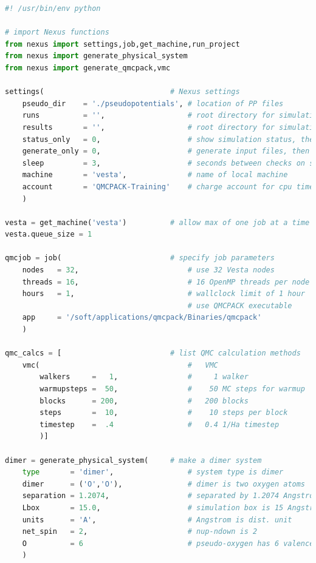 \begin{lstlisting}[language=Python]
#! /usr/bin/env python

# import Nexus functions
from nexus import settings,job,get_machine,run_project 
from nexus import generate_physical_system
from nexus import generate_qmcpack,vmc

settings(                             # Nexus settings
    pseudo_dir    = './pseudopotentials', # location of PP files
    runs          = '',                   # root directory for simulations
    results       = '',                   # root directory for simulation results
    status_only   = 0,                    # show simulation status, then exit
    generate_only = 0,                    # generate input files, then exit
    sleep         = 3,                    # seconds between checks on sim. progress
    machine       = 'vesta',              # name of local machine
    account       = 'QMCPACK-Training'    # charge account for cpu time
    ) 

vesta = get_machine('vesta')          # allow max of one job at a time (lab only)
vesta.queue_size = 1

qmcjob = job(                         # specify job parameters
    nodes   = 32,                         # use 32 Vesta nodes
    threads = 16,                         # 16 OpenMP threads per node (32 MPI tasks)
    hours   = 1,                          # wallclock limit of 1 hour
                                          # use QMCPACK executable
    app     = '/soft/applications/qmcpack/Binaries/qmcpack'
    )

qmc_calcs = [                         # list QMC calculation methods
    vmc(                                  #   VMC
        walkers     =   1,                #     1 walker
        warmupsteps =  50,                #    50 MC steps for warmup
        blocks      = 200,                #   200 blocks
        steps       =  10,                #    10 steps per block
        timestep    =  .4                 #   0.4 1/Ha timestep
        )]

dimer = generate_physical_system(     # make a dimer system
    type       = 'dimer',                 # system type is dimer
    dimer      = ('O','O'),               # dimer is two oxygen atoms
    separation = 1.2074,                  # separated by 1.2074 Angstrom
    Lbox       = 15.0,                    # simulation box is 15 Angstrom 
    units      = 'A',                     # Angstrom is dist. unit
    net_spin   = 2,                       # nup-ndown is 2
    O          = 6                        # pseudo-oxygen has 6 valence el.
    )


\end{lstlisting}
